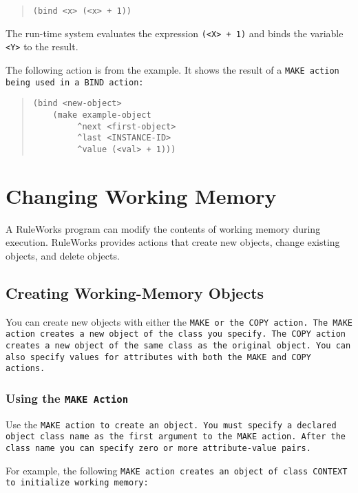 \begin{quote}
\begin{verbatim}
(bind <x> (<x> + 1))
\end{verbatim}
\end{quote}

The run-time system evaluates the expression \verb|(<X> + 1)| and
binds the variable \verb|<Y>| to the result.

The following action is from the example. It shows the result of a
\tt{MAKE} action being used in a \tt{BIND} action:

\begin{quote}
\begin{verbatim}
(bind <new-object>
    (make example-object 
         ^next <first-object>
         ^last <INSTANCE-ID> 
         ^value (<val> + 1)))
\end{verbatim}
\end{quote}

\section{Changing Working Memory}

A RuleWorks program can modify the contents of working memory during
execution. RuleWorks provides actions that create new objects, change
existing objects, and delete objects.

\subsection{Creating Working-Memory Objects}

You can create new objects with either the \tt{MAKE} or the \tt{COPY}
action. The \tt{MAKE} action creates a new object of the class you
specify.  The \tt{COPY} action creates a new object of the same class
as the original object. You can also specify values for attributes
with both the \tt{MAKE} and \tt{COPY} actions.

\subsubsection*{Using the \tt{MAKE} Action}

Use the \tt{MAKE} action to create an object. You must specify a
declared object class name as the first argument to the \tt{MAKE}
action. After the class name you can specify zero or more
attribute-value pairs.

For example, the following \tt{MAKE} action creates an object of class
\tt{CONTEXT} to initialize working memory:

